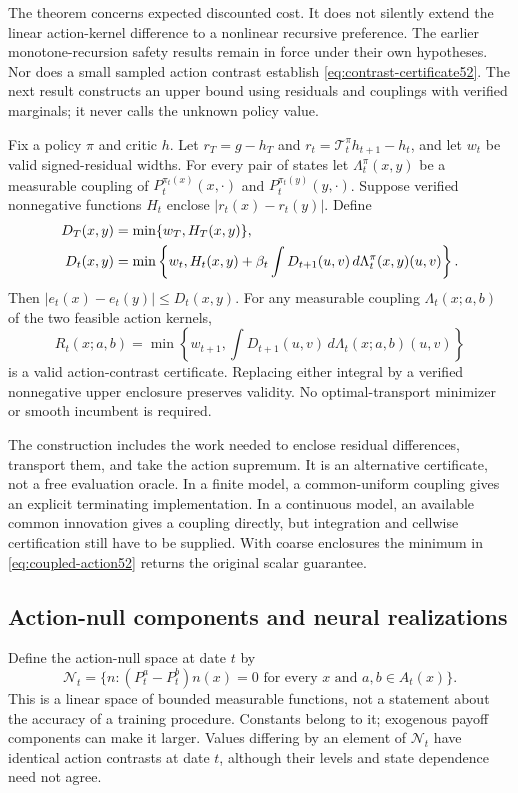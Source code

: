 The theorem concerns expected discounted cost. It does not silently extend the linear action-kernel difference to a nonlinear recursive preference. The earlier monotone-recursion safety results remain in force under their own hypotheses. Nor does a small sampled action contrast establish \eqref{eq:contrast-certificate52}. The next result constructs an upper bound using residuals and couplings with verified marginals; it never calls the unknown policy value.

\begin{proposition}\label{prop:coupled52}
Fix a policy $\pi$ and critic $h$. Let $r_T=g-h_T$ and $r_t=\mathcal T_t^\pi h_{t+1}-h_t$, and let $w_t$ be valid signed-residual widths. For every pair of states let $\Lambda_t^\pi(x,y)$ be a measurable coupling of $P_t^{\pi_t(x)}(x,\cdot)$ and $P_t^{\pi_t(y)}(y,\cdot)$. Suppose verified nonnegative functions $H_t$ enclose $|r_t(x)-r_t(y)|$. Define
\begin{align}\label{eq:coupled-residual52}
 D_T(x,y)&=\min\{w_T,H_T(x,y)\},\notag\\
 D_t(x,y)&=\min\left\{w_t,H_t(x,y)+\beta_t
       \int D_{t+1}(u,v)\,d\Lambda_t^\pi(x,y)(u,v)\right\}.
\end{align}
Then $|e_t(x)-e_t(y)|\le D_t(x,y)$. For any measurable coupling $\Lambda_t(x;a,b)$ of the two feasible action kernels,
\begin{equation}\label{eq:coupled-action52}
 R_t(x;a,b)=\min\left\{w_{t+1},
           \int D_{t+1}(u,v)\,d\Lambda_t(x;a,b)(u,v)\right\}
\end{equation}
is a valid action-contrast certificate. Replacing either integral by a verified nonnegative upper enclosure preserves validity. No optimal-transport minimizer or smooth incumbent is required.
\end{proposition}

The construction includes the work needed to enclose residual differences, transport them, and take the action supremum. It is an alternative certificate, not a free evaluation oracle. In a finite model, a common-uniform coupling gives an explicit terminating implementation. In a continuous model, an available common innovation gives a coupling directly, but integration and cellwise certification still have to be supplied. With coarse enclosures the minimum in \eqref{eq:coupled-action52} returns the original scalar guarantee.

\subsection{Action-null components and neural realizations}
Define the action-null space at date $t$ by
\[
 \mathcal N_t=\{n:(P_t^a-P_t^b)n(x)=0
                 \text{ for every }x\text{ and }a,b\in A_t(x)\}.
\]
This is a linear space of bounded measurable functions, not a statement about the accuracy of a training procedure. Constants belong to it; exogenous payoff components can make it larger. Values differing by an element of $\mathcal N_t$ have identical action contrasts at date $t$, although their levels and state dependence need not agree.

